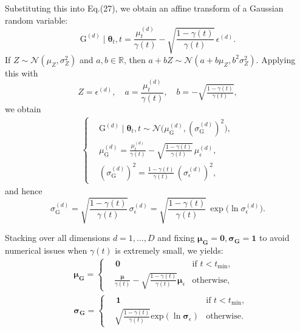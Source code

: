 \documentclass[numsec,webpdf,contemporary,large]{oup-authoring-template}%
\theoremstyle{thmstyleone}%
\theoremstyle{thmstyletwo}%
\theoremstyle{thmstylethree}%
\begin{document}
Substituting this into Eq.(27), we obtain an affine transform of a Gaussian random variable:
\begin{equation}
    \mathrm{G}^{(d)} \mid \boldsymbol{\theta}_t, t
    =
    \frac{\mu_t^{(d)}}{\gamma(t)}
    -
    \sqrt{\frac{1-\gamma(t)}{\gamma(t)}}\,
    \epsilon^{(d)}.
\end{equation}
If $Z \sim \mathcal{N}(\mu_Z, \sigma_Z^2)$ and $a,b \in \mathbb{R}$, then $a + bZ \sim \mathcal{N}(a + b\mu_Z, b^2\sigma_Z^2)$.  
Applying this with
\[
    Z = \epsilon^{(d)},\quad
    a = \frac{\mu_t^{(d)}}{\gamma(t)},\quad
    b = -\sqrt{\tfrac{1-\gamma(t)}{\gamma(t)}},
\]
we obtain
\begin{equation}
    \begin{aligned}
        \left\{
    \begin{aligned}
        & \mathrm{G}^{(d)} \mid \boldsymbol{\theta}_t, t \sim \mathcal{N}\!\Big( \mu_\mathrm{G}^{(d)}, (\sigma_\mathrm{G}^{(d)})^2 \Big), \\
        & \mu_\mathrm{G}^{(d)} = \frac{\mu_t^{(d)}}{\gamma(t)} - \sqrt{\frac{1-\gamma(t)}{\gamma(t)}}\,\mu_\epsilon^{(d)}, \\
        & (\sigma_\mathrm{G}^{(d)})^2 = \frac{1-\gamma(t)}{\gamma(t)}\, (\sigma_\epsilon^{(d)})^2,
    \end{aligned}
    \right.
    \end{aligned}
\end{equation}
and hence
\begin{equation}
    \sigma_\mathrm{G}^{(d)}
    =
    \sqrt{\frac{1-\gamma(t)}{\gamma(t)}}\,
    \sigma_\epsilon^{(d)}
    =
    \sqrt{\frac{1-\gamma(t)}{\gamma(t)}}\,
    \exp\bigl(\ln\sigma_\epsilon^{(d)}\bigr).
\end{equation}

Stacking over all dimensions $d=1,\dots,D$ and fixing $\boldsymbol{\mu}_\mathbf{G} = \mathbf{0}, \boldsymbol{\sigma}_\mathbf{G} = \mathbf{1}$ to avoid numerical issues when $\gamma(t)$ is extremely small, we yields:
\begin{equation}
    \begin{aligned}
        & \boldsymbol{\mu}_\mathbf{G} = \left\{
    \begin{aligned}
        & \, \boldsymbol{0} & \text{if $t<t_{\text{min}}$},\\
        & \frac{\boldsymbol{\mu}}{\gamma(t)} - \sqrt{\frac{1-\gamma(t)}{\gamma(t)}}\boldsymbol{\mu}_\epsilon & \text{otherwise,}
    \end{aligned}
    \right. \\
    & \boldsymbol{\sigma}_\mathbf{G} = \left\{
    \begin{aligned}
        & \, \boldsymbol{1} & \text{if $t<t_{\text{min}}$},\\
        & \sqrt{\frac{1-\gamma(t)}{\gamma(t)}}\text{exp}(\ln\boldsymbol{\sigma}_\epsilon) & \text{otherwise.}
    \end{aligned}
    \right.
    \end{aligned}
\end{equation}
\end{document}
